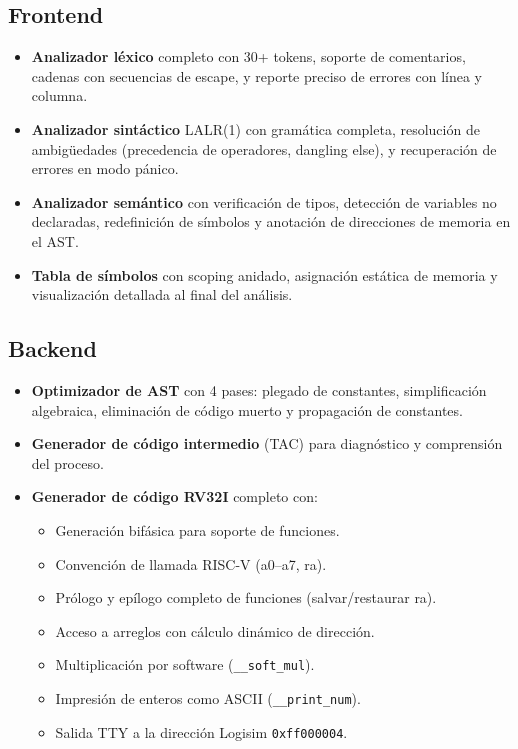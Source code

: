 \subsection{Frontend}
\begin{itemize}
    \item \textbf{Analizador léxico} completo con 30+ tokens, soporte de comentarios, cadenas con secuencias de escape, y reporte preciso de errores con línea y columna.
    \item \textbf{Analizador sintáctico} LALR(1) con gramática completa, resolución de ambigüedades (precedencia de operadores, dangling else), y recuperación de errores en modo pánico.
    \item \textbf{Analizador semántico} con verificación de tipos, detección de variables no declaradas, redefinición de símbolos y anotación de direcciones de memoria en el AST.
    \item \textbf{Tabla de símbolos} con scoping anidado, asignación estática de memoria y visualización detallada al final del análisis.
\end{itemize}

\subsection{Backend}
\begin{itemize}
    \item \textbf{Optimizador de AST} con 4 pases: plegado de constantes, simplificación algebraica, eliminación de código muerto y propagación de constantes.
    \item \textbf{Generador de código intermedio} (TAC) para diagnóstico y comprensión del proceso.
    \item \textbf{Generador de código RV32I} completo con:
    \begin{itemize}
        \item Generación bifásica para soporte de funciones.
        \item Convención de llamada RISC-V (a0--a7, ra).
        \item Prólogo y epílogo completo de funciones (salvar/restaurar ra).
        \item Acceso a arreglos con cálculo dinámico de dirección.
        \item Multiplicación por software (\texttt{\_\_soft\_mul}).
        \item Impresión de enteros como ASCII (\texttt{\_\_print\_num}).
        \item Salida TTY a la dirección Logisim \texttt{0xff000004}.
    \end{itemize}
\end{itemize}

